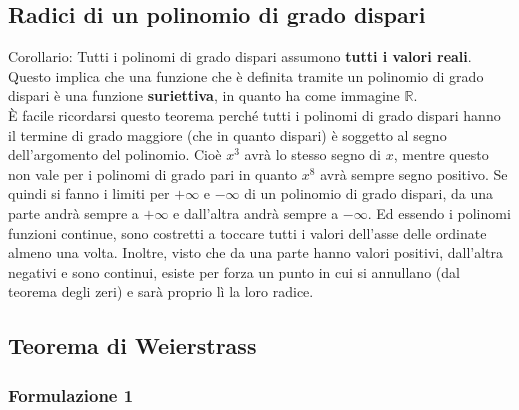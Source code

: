 \subsection{Radici di un polinomio di grado dispari}


Corollario:
Tutti i polinomi di grado dispari assumono \textbf{tutti i valori reali}. Questo implica che una funzione che è definita tramite un polinomio di grado dispari è una funzione \textbf{suriettiva}, in quanto ha come immagine $\mathbb{R}$.\\

È facile ricordarsi questo teorema perché tutti i polinomi di grado dispari hanno il termine di grado maggiore (che in quanto dispari) è soggetto al segno dell'argomento del polinomio. Cioè $x^3$ avrà lo stesso segno di $x$, mentre questo non vale per i polinomi di grado pari in quanto $x^8$ avrà sempre segno positivo. Se quindi si fanno i limiti per $+\infty$ e $-\infty$ di un polinomio di grado dispari, da una parte andrà sempre a $+\infty$ e dall'altra andrà sempre a $-\infty$. Ed essendo i polinomi funzioni continue, sono costretti a toccare tutti i valori dell'asse delle ordinate almeno una volta. Inoltre, visto che da una parte hanno valori positivi, dall'altra negativi e sono continui, esiste per forza un punto in cui si annullano (dal teorema degli zeri) e sarà proprio lì la loro radice.

\subsection{Teorema di Weierstrass}
\subsubsection{Formulazione 1} %



